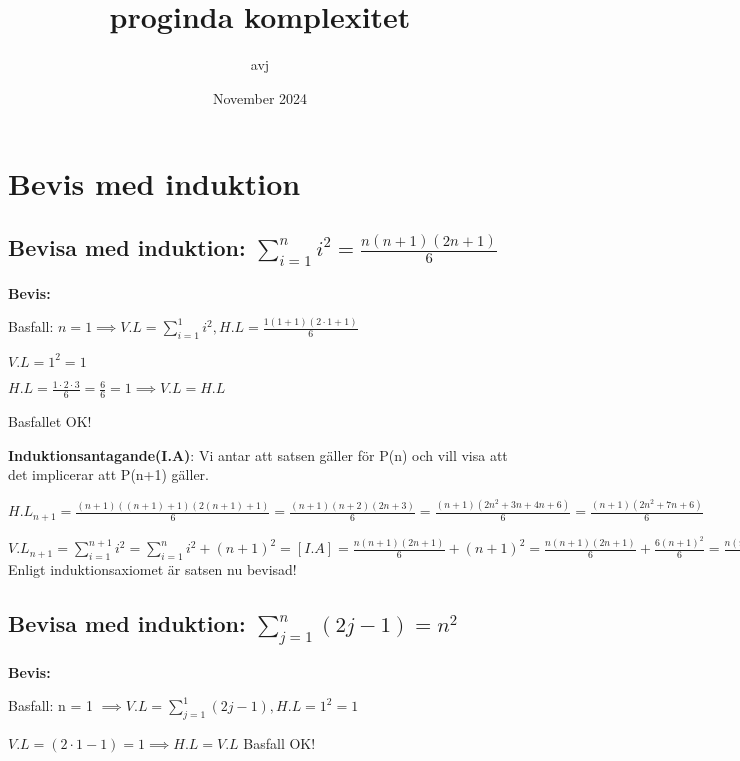 \documentclass{article}
\title{proginda komplexitet}
\author{avj }
\date{November 2024}
\begin{document}
\maketitle

\section{Bevis med induktion}

\subsection{Bevisa med induktion: $\sum_{i=1}^{n} i^2 = \frac{n(n+1)(2n+1)}{6} $}

\vspace{5pt}

\textbf{Bevis: }

Basfall: $n = 1 \implies V.L = \sum_{i=1}^{1} i^2, H.L = \frac{1(1+1)(2\cdot1 + 1)}{6} $ 

$V.L = 1^2 = 1$

$H.L = \frac{1\cdot2\cdot3}{6} = \frac{6}{6} = 1 \implies V.L = H.L$

Basfallet OK!

\textbf{Induktionsantagande(I.A)}: 
Vi antar att satsen gäller för P(n) och vill visa att det implicerar att P(n+1) gäller.

\vspace{5pt}

$H.L_{n+1} = \frac{(n+1)((n+1)+1)(2(n+1)+1)}{6} =\frac{(n+1)(n+2)(2n+3)}{6} = \frac{(n+1)(2n^2 + 3n + 4n + 6)}{6} = \frac{(n+1)(2n^2 + 7n + 6)}{6} $

$V.L_{n+1} =\sum_{i=1}^{n+1} i^2 = \sum_{i=1}^{n} i^2 + (n+1)^2 = [I.A] = \frac{n(n+1)(2n+1)}{6} +(n+1)^2 = \frac{n(n+1)(2n+1)}{6} + \frac{6(n+1)^2}{6} = \frac{n(n+1)(2n+1) + 6(n+1)^2}{6} = 
\frac{(n+1)(n(2n+1)+6(n+1))}{6} =\frac{(n+1)(2n^2 + n + 6n + 6)}{6} = \frac{(n+1)(2n^2 + 7n + 6)}{6}  \implies V.L_{n+1} = H.L_{n+1} \implies 
$Enligt induktionsaxiomet är satsen nu bevisad!

\subsection{Bevisa med induktion: $\sum_{j=1}^{n}(2j - 1) = n^2$ }

\textbf{Bevis: }

Basfall: n = 1 $\implies V.L = \sum_{j=1}^{1}(2j - 1), H.L = 1^2 = 1$

$V.L = (2\cdot1 - 1) = 1 \implies H.L = V.L$ Basfall OK!
\end{document}
